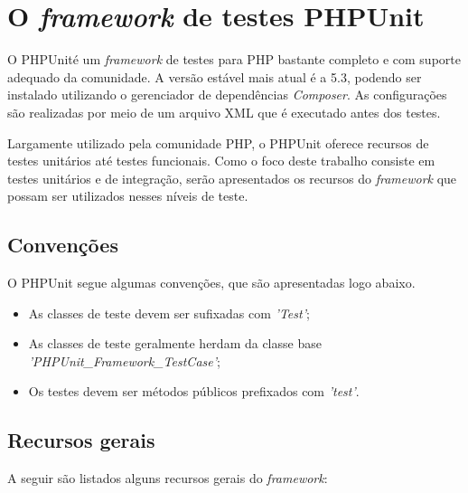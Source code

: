 \vfill
\pagebreak


\section{O \textit{framework} de testes PHPUnit}

  O PHPUnit\footnotemark  é um \textit{framework} de testes para PHP bastante completo e com suporte adequado
  da comunidade. A versão estável mais atual é a 5.3, podendo ser instalado utilizando o gerenciador
  de dependências \textit{Composer}. As configurações são realizadas por meio de um arquivo XML que é 
  executado antes dos testes.
  
  Largamente utilizado pela comunidade PHP, o PHPUnit oferece recursos de testes unitários até
  testes funcionais. Como o foco deste trabalho consiste em testes unitários e de integração, serão
  apresentados os recursos do \textit{framework} que possam ser utilizados nesses níveis de teste.
  
  \subsection{Convenções}
    
    O PHPUnit segue algumas convenções, que são apresentadas logo abaixo.
    
    \begin{itemize}
      \item As classes de teste devem ser sufixadas com \textit{'Test'};
      
      \item As classes de teste geralmente herdam da classe base \textit{'PHPUnit\_Framework\_TestCase'};
      
      \item Os testes devem ser métodos públicos prefixados com \textit{'test'}.
    \end{itemize}

  
  \subsection{Recursos gerais}
  
    A seguir são listados alguns recursos gerais do \textit{framework}:
    
